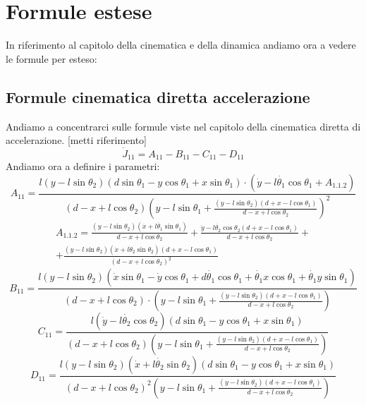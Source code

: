 \section{Formule estese}
In riferimento al capitolo della cinematica e della dinamica andiamo ora a vedere le formule per esteso:
\subsection{Formule cinematica diretta accelerazione}
Andiamo a concentrarci sulle formule viste nel capitolo della cinematica diretta di accelerazione. [metti riferimento]
\begin{equation}
\dot{J}_{11} = A_{11} - B_{11} - C_{11} - D_{11}
\end{equation}
Andiamo ora a definire i parametri: 
\begin{equation*}
A_{11} = \frac{l(y-l\sin\theta_{2})(d\sin\theta_{1}-y\cos\theta _{1}+x\sin\theta _{1})\cdot (\dot{y}-l\dot{\theta_1}\cos\theta _{1}+A_{1.1.2})}{(d-x+l\cos\theta_{2})(y-l\sin\theta_{1}+\frac{(y-l\sin\theta _{2})(d+x-l\cos\theta _{1})}{d-x+l\cos\theta _{2}})^2}
\end{equation*}
\begin{equation*}
\begin{split}
A_{1.1.2} = \frac{(y-l\sin\theta_{2})(\dot{x}+l\dot{\theta_1}\sin\theta_{1})}{d-x+l\cos\theta_{2}}+\frac{\dot{y}-l\dot{\theta_2}\cos\theta_{2}(d+x-l\cos\theta_{1})}{d-x+l\cos\theta_{2}}+  \\
+ \frac{(y-l\sin\theta_{2})(\dot{x}+l\dot{\theta}_{2}\sin\theta_{2})(d+x-l\cos\theta_{1})}{{(d-x+l\cos\theta_{2})}^2}
\end{split}
\end{equation*}
\begin{equation*}
B_{11} =\frac{l(y-l\sin\theta_{2})(\dot{x}\sin\theta_{1}-\dot{y}\cos\theta_{1}+d\dot{\theta_1}\cos\theta_{1}+\dot{\theta_1}x\cos\theta_{1}+\dot{\theta_{1}}y\sin\theta _{1})}{(d-x+l\cos\theta_{2})\cdot(y-l\sin\theta_{1}+\frac{(y-l\sin\theta_{2})(d+x-l\cos\theta_{1})}{d-x+l\cos\theta_{2}})}
\end{equation*}
\begin{equation*}
C_{11} = \frac{l(\dot{y}-l\dot{\theta_{2}}\cos\theta_{2})(d\sin\theta_{1}
    -y\cos\theta_{1}+x\sin\theta_{1})}{(d-x+l\cos\theta_{2})(y-l\sin\theta_{1}+\frac{(y-l\sin\theta_{2})
    (d+x-l\cos\theta_{1})}{d-x+l\cos\theta_{2}})}
\end{equation*}
\begin{equation*}
D_{11} = \frac{l(y-l\sin\theta_{2})(\dot{x}+l\dot{\theta_2}\sin\theta_{2})
    (d\sin\theta_{1}-y\cos\theta_{1}+x\sin\theta_{1})}{(d-x+l\cos\theta_{2})^2(y-l\sin\theta_{1}+\frac{(y-l\sin\theta_{2})
    (d+x-l\cos\theta_{1})}{d-x+l\cos\theta _{2}})}
\end{equation*}
